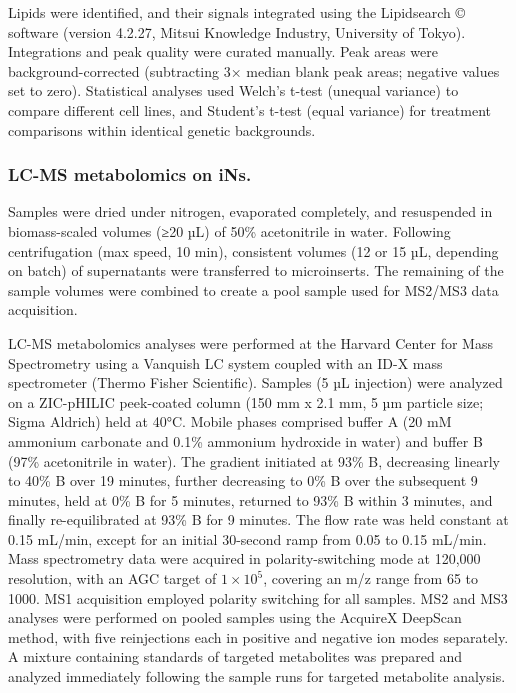 Lipids were identified, and their signals integrated using the Lipidsearch © software (version 4.2.27, Mitsui Knowledge Industry, University of Tokyo). Integrations and peak quality were curated manually. Peak areas were background-corrected (subtracting 3× median blank peak areas; negative values set to zero). Statistical analyses used Welch's t-test (unequal variance) to compare different cell lines, and Student's t-test (equal variance) for treatment comparisons within identical genetic backgrounds.

\subsubsection{LC-MS metabolomics on iNs.}
Samples were dried under nitrogen, evaporated completely, and resuspended in biomass-scaled volumes (≥20 µL) of 50\% acetonitrile in water. Following centrifugation (max speed, 10 min), consistent volumes (12 or 15 µL, depending on batch) of supernatants were transferred to microinserts. The remaining of the sample volumes were combined to create a pool sample used for MS2/MS3 data acquisition.

LC-MS metabolomics analyses were performed at the Harvard Center for Mass Spectrometry using a Vanquish LC system coupled with an ID-X mass spectrometer (Thermo Fisher Scientific). Samples (5 µL injection) were analyzed on a ZIC-pHILIC peek-coated column (150 mm x 2.1 mm, 5 µm particle size; Sigma Aldrich) held at 40°C. Mobile phases comprised buffer A (20 mM ammonium carbonate and 0.1\% ammonium hydroxide in water) and buffer B (97\% acetonitrile in water). The gradient initiated at 93\% B, decreasing linearly to 40\% B over 19 minutes, further decreasing to 0\% B over the subsequent 9 minutes, held at 0\% B for 5 minutes, returned to 93\% B within 3 minutes, and finally re-equilibrated at 93\% B for 9 minutes. The flow rate was held constant at 0.15 mL/min, except for an initial 30-second ramp from 0.05 to 0.15 mL/min. Mass spectrometry data were acquired in polarity-switching mode at 120,000 resolution, with an AGC target of $1 \times 10^5$, covering an m/z range from 65 to 1000. MS1 acquisition employed polarity switching for all samples. MS2 and MS3 analyses were performed on pooled samples using the AcquireX DeepScan method, with five reinjections each in positive and negative ion modes separately. A mixture containing standards of targeted metabolites was prepared and analyzed immediately following the sample runs for targeted metabolite analysis.

